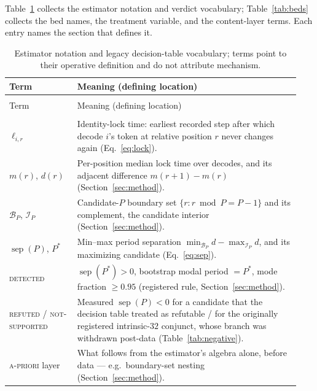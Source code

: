 \documentclass{article}
\begin{document}
Table~\ref{tab:glossary} collects the estimator notation and verdict vocabulary;
Table~\ref{tab:beds} collects the bed names, the treatment variable, and the
content-layer terms. Each entry names the section that defines it.

\begingroup
\footnotesize
\setlength{\tabcolsep}{3pt}
\setlength{\LTpre}{3pt}
\setlength{\LTpost}{6pt}
\FloatBarrier
\begin{longtable}{@{}>{\raggedright\arraybackslash}p{0.22\linewidth}
                       >{\raggedright\arraybackslash}p{0.72\linewidth}@{}}
\caption{Estimator notation and legacy decision-table vocabulary; terms point to
their operative definition and do not attribute mechanism.}\label{tab:glossary}\\
\toprule
Term & Meaning (defining location) \\
\midrule
\endfirsthead
\multicolumn{2}{@{}l}{\footnotesize\itshape Table~\thetable{} continued}\\
\toprule
Term & Meaning (defining location) \\
\midrule
\endhead
\midrule
\multicolumn{2}{r@{}}{\footnotesize\itshape Continued on next page}\\
\endfoot
\bottomrule
\endlastfoot
$\ell_{i,r}$ & Identity-lock time: earliest recorded step after which decode
$i$'s token at relative position $r$ never changes again (Eq.~\eqref{eq:lock}). \\
$m(r)$, $d(r)$ & Per-position median lock time over decodes, and its adjacent
difference $m(r{+}1)-m(r)$ (Section~\ref{sec:method}). \\
$\mathcal B_P$, $\mathcal I_P$ & Candidate-$P$ boundary set
$\{r:r\bmod P=P-1\}$ and its complement, the candidate interior
(Section~\ref{sec:method}). \\
$\operatorname{sep}(P)$, $P^*$ & Min--max period separation
$\min_{\mathcal B_P}d-\max_{\mathcal I_P}d$, and its maximizing candidate
(Eq.~\eqref{eq:sep}). \\
\textsc{detected} & $\operatorname{sep}(P^*)>0$, bootstrap modal period $=P^*$,
mode fraction $\ge0.95$ (registered rule, Section~\ref{sec:method}). \\
\textsc{refuted} / \textsc{not-supported} & Measured $\operatorname{sep}(P)<0$
for a candidate that the decision table treated as refutable / for the
originally registered intrinsic-$32$ conjunct, whose branch was withdrawn
post-data (Table~\ref{tab:negative}). \\
\textsc{a-priori} layer & What follows from the estimator's algebra alone,
before data --- e.g.\ boundary-set nesting (Section~\ref{sec:method}). \\

\end{longtable}
\end{document}

